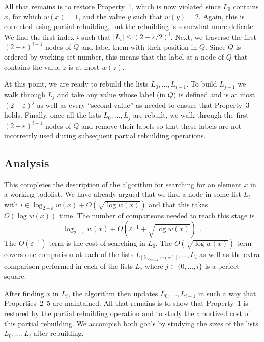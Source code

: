 \documentclass[12pt]{patmorin}
\newcommand{\eps}{\varepsilon}
\begin{document}
All that remains is to restore Property~1, which is now violated
since $L_0$ contains $x$, for which $w(x)=1$, and the value $y$ such
that $w(y)=2$.  Again, this is corrected using partial rebuilding,
but the rebuilding is somewhat more delicate.  We find the first index
$i$ such that $|L_i|\le (2-\eps/2)^i$.  Next, we traverse the first
$(2-\eps)^{i-1}$ nodes of $Q$ and label them with their position in $Q$.
Since $Q$ is ordered by working-set number, this means that the label
at a node of $Q$ that contains the value $z$ is at most $w(z)$.

At this point, we are ready to rebuild the lists $L_0,\ldots,L_{i-1}$. To
build $L_{j-1}$ we walk through $L_j$ and take any value whose label
(in $Q$) is defined and is at most $(2-\eps)^j$ as well as every
``second value'' as needed to ensure that Property~3 holds.  Finally,
once all the lists $L_0,\ldots,L_j$ are rebuilt, we walk through the first
$(2-\eps)^{i-1}$ nodes of $Q$ and remove their labels so that these labels
are not incorrectly used during subsequent partial rebuilding operations.

\subsection{Analysis}

This completes the description of the algorithm for searching for an
element $x$ in a working-todolist.  We have already argued that we find
a node in some list $L_i$ with $i\in \log_{2-\eps} w(x) + O(\sqrt{\log
w(x)})$ and that this takes $O(\log w(x))$ time.  The number of comparisons
needed to reach this stage is
\[
     \log_{2-\eps} w(x) + O\left(\eps^{-1} + \sqrt{\log w(x)}\right) \enspace .
\]
The $O(\eps^{-1})$ term is the cost of searching in $L_0$. The
$O(\sqrt{\log w(x)})$ term covers one comparison at each of the lists
$L_{\lceil\log_{2-\eps} w(x)\rceil},\ldots,L_i$ as well as the extra
comparison performed in each of the lists $L_j$ where $j\in\{0,\ldots,i\}$
is a perfect square.

After finding $x$ in $L_i$, the algorithm then updates
$L_0,\ldots,L_{i-1}$ in such a way that Properties~2--5 are maintained.
All that remains is to show that Property~1 is restored by the partial
rebuilding operation and to study the amortized cost of this partial
rebuilding.  We accompish both goals by studying the sizes of the lists
$L_0,\ldots,L_i$ after rebuilding.
\end{document}
